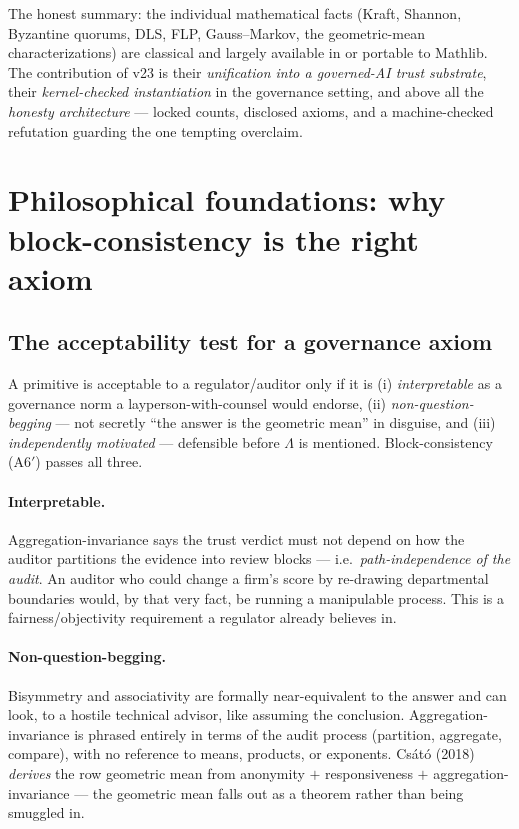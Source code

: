 \documentclass[11pt]{article}
\theoremstyle{plain}
\theoremstyle{definition}
\theoremstyle{remark}
\newcommand{\La}{\Lambda}
\begin{document}
The honest summary: the individual mathematical facts (Kraft, Shannon, Byzantine
quorums, DLS, FLP, Gauss--Markov, the geometric-mean characterizations) are
classical and largely available in or portable to Mathlib. The contribution of v23
is their \emph{unification into a governed-AI trust substrate}, their
\emph{kernel-checked instantiation} in the governance setting, and above all the
\emph{honesty architecture} --- locked counts, disclosed axioms, and a
machine-checked refutation guarding the one tempting overclaim.

\section{Philosophical foundations: why block-consistency is the right axiom}
\label{sec:phil}

\subsection{The acceptability test for a governance axiom}
A primitive is acceptable to a regulator/auditor only if it is (i) \emph{interpretable}
as a governance norm a layperson-with-counsel would endorse, (ii) \emph{non-question-begging}
--- not secretly ``the answer is the geometric mean'' in disguise, and (iii)
\emph{independently motivated} --- defensible before $\La$ is mentioned. Block-consistency
(A6$'$) passes all three.

\paragraph{Interpretable.} Aggregation-invariance says the trust verdict must not
depend on how the auditor partitions the evidence into review blocks --- i.e.\
\emph{path-independence of the audit}. An auditor who could change a firm's score by
re-drawing departmental boundaries would, by that very fact, be running a manipulable
process. This is a fairness/objectivity requirement a regulator already believes in.

\paragraph{Non-question-begging.} Bisymmetry and associativity are formally near-equivalent
to the answer and can look, to a hostile technical advisor, like assuming the
conclusion. Aggregation-invariance is phrased entirely in terms of the audit process
(partition, aggregate, compare), with no reference to means, products, or exponents.
Cs\'at\'o (2018) \emph{derives} the row geometric mean from anonymity $+$
responsiveness $+$ aggregation-invariance \cite{csato2018} --- the geometric mean
falls out as a theorem rather than being smuggled in.
\end{document}
